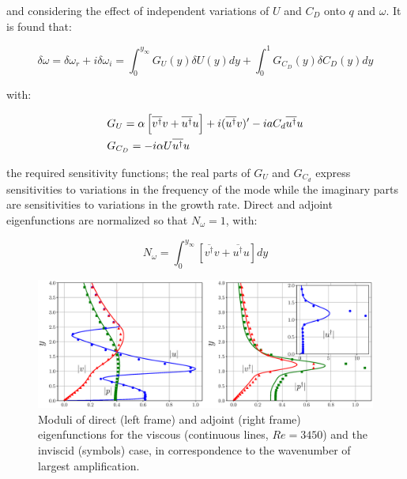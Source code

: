 and considering the effect of independent variations of $U$ and $C_D$ onto $q$ and $\omega$. It is found that:

\begin{equation}
\delta \omega =\delta \omega_r + i \delta \omega_i= \int_0^{y_{\infty}}  G_U(y) \delta U(y) dy + \int_0^{1}  G_{C_D}(y) \delta C_D(y) dy
\label{eq:s_omega}
\end{equation}

with:

\begin{equation}
\begin{split}
&G_{U} =  \alpha \left[ \overline{v^{\dagger}} v + \overline{u^{\dagger}} u  \right] +i   (\overline{u^{\dagger}}   v)' -i a C_d \overline{u^{\dagger}}  u \vspace{0.3cm}\\
&G_{C_D} =  - i \alpha  U  \overline{u^{\dagger}} u
\label{eq:GCD}
\end{split}
\end{equation}

the required sensitivity functions; the real parts of $G_U$ and $G_{C_d}$ express sensitivities to variations in
the frequency of the mode while the imaginary parts are sensitivities to variations in the growth rate.
Direct and adjoint eigenfunctions are normalized so that $N_{\omega} = 1$, with:

\begin{equation}
N_{\omega} = \int_0^{y_{\infty}} \left[ \overline{ v^{\dagger}} v  +  \overline{ u^{\dagger}} u \right] dy
\label{eq:norm}
\end{equation}

\begin{figure}[h]
	\centering
	\includegraphics[width=1\linewidth]{chapter_3/figure/3}
	\caption{Moduli of direct (left frame) and adjoint (right frame) eigenfunctions for the viscous (continuous lines, $Re = 3450$)
		and the inviscid (symbols) case, in correspondence to the wavenumber of largest amplification.}
	\label{fig:3}
\end{figure}

